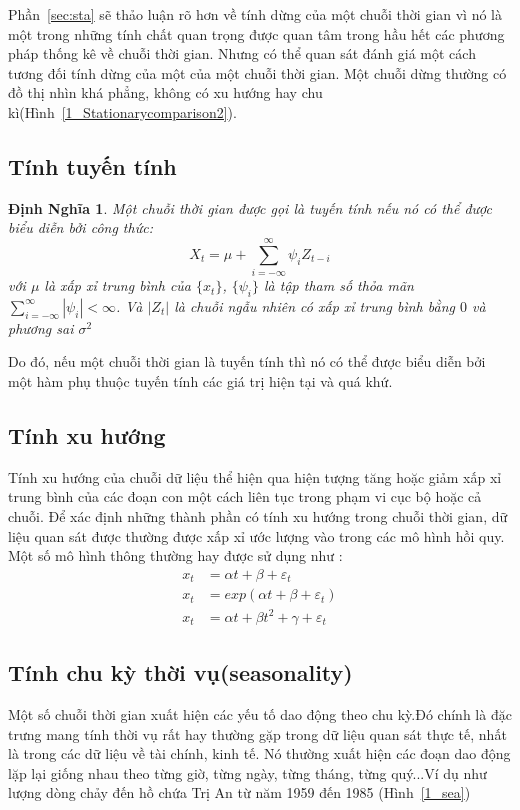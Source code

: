 \documentclass[twoside,12pt]{Latex/Classes/PhDthesisPSnPDF}
\newtheorem{defi}{Định Nghĩa}[chapter]
\begin{document}
Phần~\ref{sec:sta} sẽ thảo luận rõ hơn về tính dừng của một chuỗi thời gian vì nó là một trong những tính chất quan trọng được quan tâm trong hầu hết các phương pháp thống kê về chuỗi thời gian. Nhưng có thể quan sát đánh giá một cách tương đối tính dừng của một của một chuỗi thời gian. Một chuỗi dừng thường có đồ thị nhìn khá phẳng, không có xu hướng hay chu kì(Hình~\ref{1_Stationarycomparison2}).

\subsection{Tính tuyến tính}
\begin{defi}
	Một chuỗi thời gian được gọi là tuyến tính\cite{afts3} nếu nó có thể được biểu diễn bởi công thức:
	\begin{equation}
		X_t = \mu+\sum\limits_{i = -\infty}^{\infty}\psi_iZ_{t-i}
	\end{equation}
	với $\mu$ là xấp xỉ trung bình của $\{x_t\}$, $\{ \psi_i\}$ là tập tham số thỏa mãn $\sum\limits_{i = -\infty}^{\infty}|\psi_i| < \infty$. Và $|Z_t|$ là chuỗi ngẫu nhiên có xấp xỉ trung bình bằng $0$ và phương sai $\sigma^2$
\end{defi}
Do đó, nếu một chuỗi thời gian là tuyến tính thì nó có thể được biểu diễn bởi một hàm phụ thuộc tuyến tính các giá trị hiện tại và quá khứ.

\subsection{Tính xu hướng} 
Tính xu hướng của chuỗi dữ liệu thể hiện qua hiện tượng tăng hoặc giảm xấp xỉ trung bình của các đoạn con một cách liên tục trong phạm vi cục bộ hoặc cả chuỗi. Để xác định những thành phần có tính xu hướng trong chuỗi thời gian, dữ liệu quan sát được thường được xấp xỉ ước lượng vào trong các mô hình hồi quy. Một số mô hình thông thường hay được sử dụng như :
\begin{align}
	x_t &= \alpha{t}+ \beta + \varepsilon_t \\
	x_t &= exp(\alpha{t}+ \beta + \varepsilon_t) \\
	x_t &= \alpha{t} + \beta{t}^{2} + \gamma + \varepsilon_t
\end{align}
\subsection{Tính chu kỳ thời vụ(seasonality)}
Một số chuỗi thời gian xuất hiện các yếu tố dao động theo chu kỳ.Đó chính là đặc trưng mang tính thời vụ rất hay thường gặp trong dữ liệu quan sát thực tế, nhất là trong các dữ liệu về tài chính, kinh tế. Nó thường xuất hiện các đoạn dao động lặp lại giống nhau theo từng giờ, từng ngày, từng tháng, từng quý...Ví dụ như lượng dòng chảy đến hồ chứa Trị An từ năm 1959 đến 1985 (Hình~\ref{1_sea})
\end{document}
